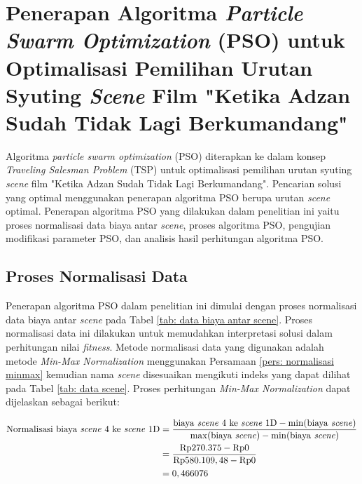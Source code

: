 \vspace{-3mm}


\section{Penerapan Algoritma \textit{Particle Swarm Optimization} (PSO) untuk Optimalisasi Pemilihan Urutan Syuting \textit{Scene}  Film "Ketika Adzan Sudah Tidak Lagi Berkumandang"}
\vspace{-4mm}
{\frenchspacing
Algoritma \textit{particle swarm optimization} (PSO) diterapkan ke dalam konsep \textit{Traveling Salesman Problem} (TSP) untuk optimalisasi pemilihan urutan syuting \textit{scene}  film "Ketika Adzan Sudah Tidak Lagi Berkumandang".
Pencarian solusi yang optimal menggunakan penerapan algoritma PSO berupa urutan \textit{scene} optimal.
Penerapan algoritma PSO yang dilakukan dalam penelitian ini yaitu proses normalisasi data biaya antar \textit{scene}, proses algoritma PSO, pengujian modifikasi parameter PSO, dan analisis hasil perhitungan algoritma PSO.

\vspace{-5mm}
\subsection{Proses Normalisasi Data}
{\frenchspacing
Penerapan algoritma PSO dalam penelitian ini dimulai dengan proses normalisasi data biaya antar \textit{scene} pada Tabel \ref{tab: data biaya antar scene}.
Proses normalisasi data ini dilakukan untuk memudahkan interpretasi solusi dalam perhitungan nilai \textit{fitness}.
Metode normalisasi data yang digunakan adalah metode \textit{Min-Max Normalization} menggunakan Persamaan \ref{pers: normalisasi minmax} kemudian nama \textit{scene} disesuaikan mengikuti indeks yang dapat dilihat pada Tabel \ref{tab: data scene}.
Proses perhitungan \textit{Min-Max Normalization} dapat dijelaskan sebagai berikut:

{\small
\begin{equation*}
    \begin{aligned}
        \text{Normalisasi biaya \textit{scene} 4 ke \textit{scene} 1D} & = \frac{\text{biaya \textit{scene} 4 ke \textit{scene} 1D} - \operatorname{min}(\text{biaya \textit{scene}})}{\operatorname{max}(\text{biaya \textit{scene}}) - \operatorname{min}(\text{biaya \textit{scene}})} \\
                                                                       & = \frac{\text{Rp}270.375-\text{Rp}0}{\text{Rp}580.109,48-\text{Rp}0}                                                                                                                                             \\
                                                                       & = 0,466076
    \end{aligned}
\end{equation*}
}

}}
